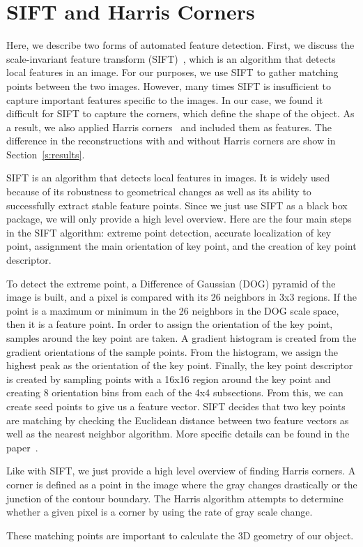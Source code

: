 \section{SIFT and Harris Corners}
\label{s:sift}

Here, we describe two forms of automated feature detection. First, we discuss the scale-invariant feature transform (SIFT)~\cite{SIFT}, which is an algorithm that detects local features in an image. For our purposes, we use SIFT to gather matching points between the two images. However, many times SIFT is insufficient to capture important features specific to the images. In our case, we found it difficult for SIFT to capture the corners, which define the shape of the object. As a result, we also applied Harris corners~\cite{Corners} and included them as features. The difference in the reconstructions with and without Harris corners are show in Section~\ref{s:results}.

SIFT is an algorithm that detects local features in images. It is widely used because of its robustness to geometrical changes as well as its ability to successfully extract stable feature points. Since we just use SIFT as a black box package, we will only provide a high level overview. Here are the four main steps in the SIFT algorithm: extreme point detection, accurate localization of key point, assignment the main orientation of key point, and the creation of key point descriptor. 

To detect the extreme point, a Difference of Gaussian (DOG) pyramid of the image is built, and a pixel is compared with its 26 neighbors in 3x3 regions. If the point is a maximum or minimum in the 26 neighbors in the DOG scale space, then it is a feature point. In order to assign the orientation of the key point, samples around the key point are taken. A gradient histogram is created from the gradient orientations of the sample points. From the histogram, we assign the highest peak as the orientation of the key point. Finally, the key point descriptor is created by sampling points with a 16x16 region around the key point and creating 8 orientation bins from each of the 4x4 subsections. From this, we can create seed points to give us a feature vector. SIFT decides that two key points are matching by checking the Euclidean distance between two feature vectors as well as the nearest neighbor algorithm. More specific details can be found in the paper~\cite{SIFT}.

Like with SIFT, we just provide a high level overview of finding Harris corners. A corner is defined as a point in the image where the gray changes drastically or the junction of the contour boundary. The Harris algorithm attempts to determine whether a given pixel is a corner by using the rate of gray scale change. 

These matching points are important to calculate the 3D geometry of our object.